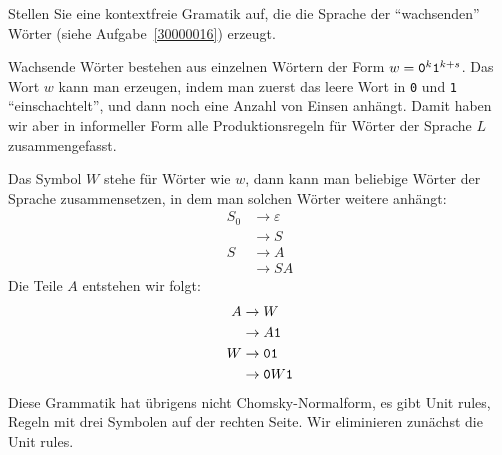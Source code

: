 Stellen Sie eine kontextfreie Gramatik auf, die die Sprache der ``wachsenden''
Wörter  (siehe Aufgabe~\ref{30000016}) erzeugt.


\begin{loesung}
Wachsende Wörter bestehen aus einzelnen Wörtern der Form
$w={\tt 0}^k{\tt 1}^{k+s}$.  Das Wort $w$ kann man erzeugen,
indem man zuerst das leere Wort in {\tt 0} und {\tt 1}
``einschachtelt'', und dann noch eine Anzahl von Einsen anhängt.
Damit haben wir aber in informeller Form alle Produktionsregeln
für Wörter der Sprache $L$ zusammengefasst.

Das Symbol $W$ stehe für Wörter wie $w$, dann kann man beliebige Wörter der
Sprache zusammensetzen, in dem man solchen Wörter weitere anhängt:
\begin{align*}
S_0&\to \varepsilon\\
   &\to S\\
S&\to A\\
 &\to SA
\end{align*}
Die Teile $A$ entstehen wir folgt:
\begin{align*}
A&\to W\\
 &\to A{\tt 1}\\
W&\to {\tt01}\\
 &\to {\tt 0}W{\tt 1}\\
\end{align*}
Diese Grammatik hat übrigens nicht Chomsky-Normalform, es gibt Unit rules,
Regeln mit drei Symbolen auf der rechten Seite. Wir eliminieren zunächst
die Unit rules.


\end{loesung}
